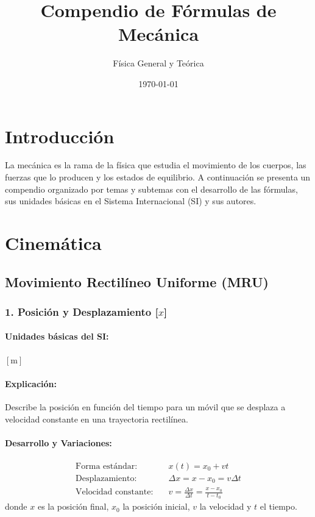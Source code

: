 \documentclass[12pt,a4paper]{article}
\title{\textbf{Compendio de Fórmulas de Mecánica}}
\author{Física General y Teórica}
\date{\today}
\begin{document}
\maketitle

\section*{Introducción}
La mecánica es la rama de la física que estudia el movimiento de los cuerpos, las fuerzas que lo producen y los estados de equilibrio. A continuación se presenta un compendio organizado por temas y subtemas con el desarrollo de las fórmulas, sus unidades básicas en el Sistema Internacional (SI) y sus autores.

\section{Cinemática}

\subsection{Movimiento Rectilíneo Uniforme (MRU)}

\subsubsection*{1. Posición y Desplazamiento [$x$]}
\paragraph*{Unidades básicas del SI:} $[\text{m}]$
\paragraph*{Explicación:} Describe la posición en función del tiempo para un móvil que se desplaza a velocidad constante en una trayectoria rectilínea.
\paragraph*{Desarrollo y Variaciones:}
\begin{align*}
\text{Forma estándar:} \quad & x(t) = x_0 + v t \\
\text{Desplazamiento:} \quad & \Delta x = x - x_0 = v \Delta t \\
\text{Velocidad constante:} \quad & v = \frac{\Delta x}{\Delta t} = \frac{x - x_0}{t - t_0}
\end{align*}
donde $x$ es la posición final, $x_0$ la posición inicial, $v$ la velocidad y $t$ el tiempo.
\end{document}
